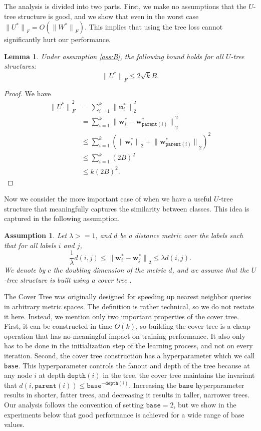\documentclass[twoside]{article}
\newtheorem{assumption}{Assumption}
\newtheorem{lemma}{Lemma}
\newcommand{\parent}[1]{\texttt{parent}({#1})}
\renewcommand{\star}[1]{{#1}^{*}}
\newcommand{\uu}{\mathbf u}
\newcommand{\w}{\mathbf w}
\newcommand{\ltwo}[1]{{\lVert {#1} \rVert}_2}
\newcommand{\lF}[1]{{\lVert {#1} \rVert}_F}
\newcommand{\depth}[1]{\texttt{depth}({#1})}
\begin{document}
{The analysis is divided into two parts.
First, we make no assumptions that the $U$-tree structure is good,
and we show that even in the worst case $\lF{\star U} = O(\lF{\star W})$.
This implies that using the tree loss cannot significantly hurt our performance.
\begin{lemma}
    \label{lemma:starU}
    Under assumption \ref{ass:B},
    the following bound holds for all $U$-tree structures:
    \begin{equation}
        \lF{\star U} \le 2\sqrt{k}B.
    \end{equation}
\end{lemma}
\begin{proof}
    We have
    \begin{align}
        \lF{\star U}^2 
        &= \sum_{i=1}^k \ltwo{\star\uu_i}^2 \\
        &= \sum_{i=1}^k \ltwo{\star\w_i - \star\w_{\parent{i}}}^2 \\
        &\le \sum_{i=1}^k \left(\ltwo{\star\w_i} + \ltwo{\star\w_{\parent{i}}} \right)^2 \\
        &\le \sum_{i=1}^k (2B)^2 \\
        &\le k (2B)^2
        .
    \end{align}
\end{proof}
Now we consider the more important case of when we have a useful $U$-tree structure that meaningfully captures the similarity between classes.
This idea is captured in the following assumption.
\begin{assumption}
    \label{ass:metric}
    Let $\lambda >= 1$, and $d$ be a distance metric over the labels such that for all labels $i$ and $j$,
\begin{equation}
    \frac 1 \lambda d(i,j)
    \le \ltwo{\star \w_i - \star \w_j}
    \le \lambda d(i, j).
\end{equation}
We denote by $c$ the doubling dimension of the metric $d$,
and we assume that the $U$-tree structure is built using a cover tree \citep{beygelzimer2006cover}.
\end{assumption}

The Cover Tree was originally designed for speeding up nearest neighbor queries in arbitrary metric spaces.
The definition is rather technical, so we do not restate it here.
Instead, we mention only two important properties of the cover tree.
First, it can be constructed in time $O(k)$,
so building the cover tree is a cheap operation that has no meaningful impact on training performance.
It also only has to be done in the initialization step of the learning process, and not on every iteration.
Second, the cover tree construction has a hyperparameter which we call \texttt{base}.
This hyperparameter controls the fanout and depth of the tree because at any node $i$ at depth $\depth{i}$ in the tree,
the cover tree maintains the invariant that $d(i, \parent{i}) \le \texttt{base}^{-\depth{i}}$.
Increasing the $\texttt{base}$ hyperparameter results in shorter, fatter trees,
and decreasing it results in taller, narrower trees.
Our analysis follows the convention of setting $\texttt{base}=2$,
but we show in the experiments below that good performance is achieved for a wide range of base values.

}
\end{document}
